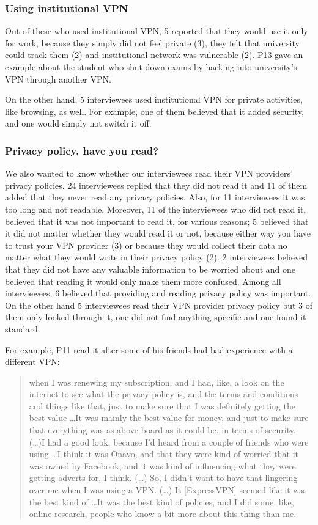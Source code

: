 \subsubsection{Using institutional VPN} Out of these who used institutional
VPN, 5 reported that they would use it only for work, because they simply did
not feel private (3), they felt that university could track them (2) and
institutional network was vulnerable  (2). P13 gave an example about the
student who shut down exams by hacking into university's VPN through another
VPN. %

On the other hand, 5 interviewees used institutional VPN for private
activities, like browsing, as well. For example, one of them believed that it
added security, and one would simply not switch it off. 

\subsubsection{Privacy policy, have you read?} We also wanted to know whether
our interviewees read their VPN providers’ privacy policies. 24 interviewees
replied that they did not read it and 11 of them added that they never read
any privacy policies. Also, for 11 interviewees it was too long and not
readable. Moreover, 11 of the interviewees who did not read it, believed that
it was not important to read it, for various reasons; 5 believed that it did
not matter whether they would read it or not, because either way you have to
trust your VPN provider (3) or because they would collect their data no matter
what they would write in their privacy policy (2). 2 interviewees believed
that they did not have any valuable information to be worried about and one
believed that reading it would only make them more confused. Among all
interviewees, 6 believed that providing and reading privacy policy was
important. On the other hand 5 interviewees read their VPN provider privacy
policy but 3 of them only looked through it, one did not find anything
specific and one found it standard. 

For example, P11 read it after some of his friends had bad experience with a
different VPN: \begin{quote}when I was renewing my subscription, and I had,
like, a look on the internet to see what the privacy policy is, and the terms
and conditions and things like that, just to make sure that I was definitely
getting the best value \dots It was mainly the best value for money, and just
to make sure that everything was as above-board as it could be, in terms of
security. (\dots)I had a good look, because I'd heard from a couple of friends
who were using \dots I think it was Onavo, and that they were kind of worried
that it was owned by Facebook, and it was kind of influencing what they were
getting adverts for, I think. (\dots) So, I didn't want to have that lingering
over me when I was using a VPN. (\dots) It [ExpressVPN] seemed like it was the
best kind of \dots It was the best kind of policies, and I did some, like,
online research, people who know a bit more about this thing than
me.\end{quote}

